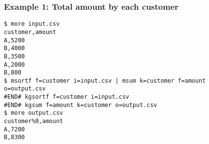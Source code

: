 \subsubsection*{Example 1: Total amount by each customer}



\begin{Verbatim}[baselinestretch=0.7,frame=single]
$ more input.csv
customer,amount
A,5200 
B,4000   
B,3500 
A,2000 
B,800 
$ msortf f=customer i=input.csv | msum k=customer f=amount o=output.csv
#END# kgsortf f=customer i=input.csv
#END# kgsum f=amount k=customer o=output.csv
$ more output.csv
customer%0,amount
A,7200
B,8300
\end{Verbatim}

